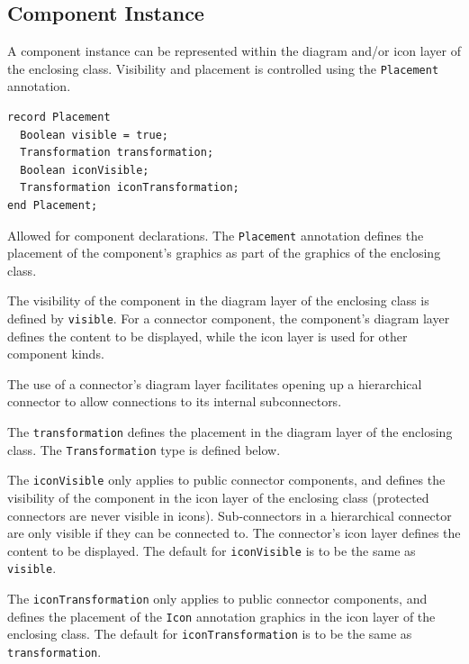 \subsection{Component Instance}\label{component-instance}

A component instance can be represented within the diagram and/or icon layer of the enclosing class.
Visibility and placement is controlled using the \lstinline!Placement! annotation.

\begin{annotationdefinition}[Placement]
\begin{synopsis}\begin{lstlisting}
record Placement
  Boolean visible = true;
  Transformation transformation;
  Boolean iconVisible;
  Transformation iconTransformation;
end Placement;
\end{lstlisting}\end{synopsis}
\begin{semantics}
Allowed for component declarations.
The \lstinline{Placement} annotation defines the placement of the component's graphics as part of the graphics of the enclosing class.

The visibility of the component in the diagram layer of the enclosing class is defined by \lstinline!visible!.
For a connector component, the component's diagram layer defines the content to be displayed, while the icon layer is used for other component kinds.

\begin{nonnormative}
The use of a connector's diagram layer facilitates opening up a hierarchical connector to allow connections to its internal subconnectors.
\end{nonnormative}

The \lstinline!transformation! defines the placement in the diagram layer of the enclosing class.
The \lstinline!Transformation! type is defined below.

The \lstinline!iconVisible! only applies to public connector components, and defines the visibility of the component in the icon layer of the enclosing class (protected connectors are never visible in icons).
Sub-connectors in a hierarchical connector are only visible if they can be connected to.
The connector's icon layer defines the content to be displayed.
The default for \lstinline!iconVisible! is to be the same as \lstinline!visible!.

The \lstinline!iconTransformation! only applies to public connector components, and defines the placement of the \lstinline!Icon! annotation graphics in the icon layer of the enclosing class.
The default for \lstinline!iconTransformation! is to be the same as \lstinline!transformation!.
\end{semantics}
\end{annotationdefinition}

